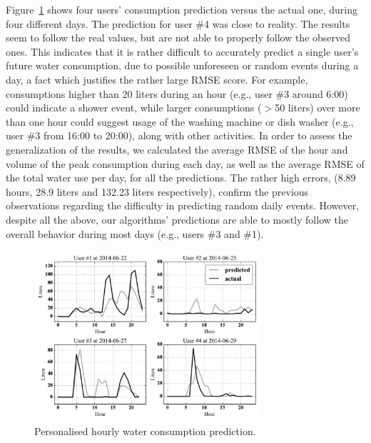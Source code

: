 Figure~\ref{figure8} shows four users' consumption prediction versus the actual one, during four different days. The prediction for user \#4 was close to reality. The results seem to follow the real values, but are not able to properly follow the observed ones. This indicates that it is rather difficult to accurately predict a single user's future water consumption, due to possible unforeseen or random events during a day, a fact which justifies the rather large RMSE score. For example, consumptions higher than 20 liters during an hour (e.g., user \#3 around 6:00) could indicate a shower event, while larger consumptions ($>$50 liters) over more than one hour could suggest usage of the washing machine or dish washer (e.g., user \#3 from 16:00 to 20:00), along with other activities. In order to assess the generalization of the results, we calculated the average RMSE of the hour and volume of the peak consumption during each day, as well as the average RMSE of the total water use per day, for all the predictions. The rather high errors, (8.89 hours, 28.9 liters and 132.23 liters respectively), confirm the previous observations regarding the difficulty in predicting random daily events. However, despite all the above, our algorithms' predictions are able to mostly follow the overall behavior during most days (e.g., users \#3 and \#1). 

\begin{figure}[!tb]
	\centering
	\includegraphics[width=0.75\textwidth]{figures/figure8.pdf}
	\caption{Personalised hourly water consumption prediction.}	
	\label{figure8}
\end{figure}

